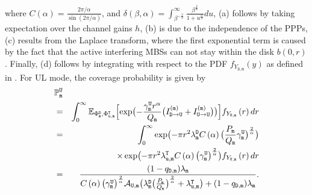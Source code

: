 \documentclass[twocolumn,english]{IEEEtran}
\theoremstyle{plain}
\theoremstyle{definition}
\begin{document}
where $C\left(\alpha\right)=\frac{2\pi/\alpha}{\sin\left(2\pi/\alpha\right)}$,
and $\delta\left(\beta,\alpha\right)=\int_{\beta^{-\frac{2}{\alpha}}}^{\infty}\frac{\beta^{\frac{2}{\alpha}}}{1+u^{\frac{\alpha}{2}}}du$,
(a) follows by taking expectation over the channel gains $h$, (b)
is due to the independence of the PPPs, (c) results from the Laplace
transform, where the first exponential term is caused by the fact
that the active interfering MBSs can not stay within the disk $b\left(0,r\right)$.
Finally, (d) follows by integrating with respect to the PDF $f_{Y_{\mathtt{D},\mathtt{m}}}(y)$
as defined in . For UL mode, the  coverage
probability is given by
\begin{eqnarray}
 & \mathbb{P}_{\mathtt{m}}^{\mathtt{U}}\nonumber \\
 & = & \int_{0}^{\infty}\mathbb{E}_{\Phi_{\mathtt{m}}^{\mathtt{D}},\Phi_{\mathtt{u},\mathtt{m}}^{\mathtt{T}}}\Bigl[\exp\bigl(-\frac{\gamma_{\mathtt{m}}^{\mathtt{U}}r^{\alpha}}{Q_{\mathtt{m}}}\bigl(\ensuremath{I_{\mathtt{D\rightarrow U}}^{\mathtt{(m)}}+I_{\mathtt{U\rightarrow U}}^{(\mathtt{m})}}\bigr)\bigr)\Bigr]f_{Y_{\mathtt{U},\mathtt{m}}}\left(r\right)dr\nonumber \\
 & = & \int_{0}^{\infty}\exp\bigl(-\pi r^{2}\lambda_{\mathtt{m}}^{\mathtt{D}}C\left(\alpha\right)\bigl(\frac{P_{\mathtt{m}}}{Q_{\mathtt{m}}}\gamma_{\mathtt{m}}^{\mathtt{U}}\bigr)^{\frac{2}{\alpha}}\bigr)\nonumber \\
 &  & \times\exp\bigl(-\pi r^{2}\lambda_{\mathtt{u,m}}^{\mathtt{T}}C\left(\alpha\right)\left(\gamma_{\mathtt{m}}^{\mathtt{U}}\right)^{\frac{2}{\alpha}}\bigr)f_{Y_{\mathtt{U},\mathtt{m}}}\left(r\right)dr\nonumber \\
 & = & \frac{(1-q_{\mathtt{D,m}})\lambda_{\mathtt{m}}}{C\left(\alpha\right)\bigl(\gamma_{\mathtt{m}}^{\mathtt{U}}\bigr)^{\frac{2}{\alpha}}\mathcal{A}_{\mathtt{U}\mathtt{,m}}\bigl(\lambda_{\mathtt{m}}^{\mathtt{D}}\bigl(\frac{P_{\mathtt{m}}}{Q_{\mathtt{m}}}\bigr)^{\frac{2}{\alpha}}+\lambda_{\mathtt{u,m}}^{\mathtt{T}}\bigr)+(1-q_{\mathtt{D,m}})\lambda_{\mathtt{m}}}.\nonumber \\
\label{eq:Cov_um}
\end{eqnarray}
\end{document}
